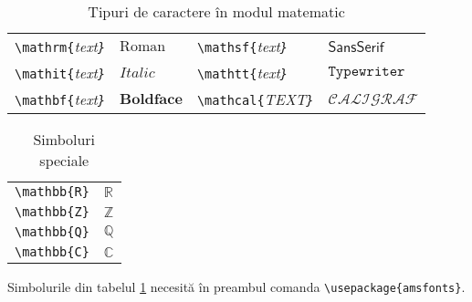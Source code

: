 \documentclass{article}
\begin{document}
\begin{table}
\begin{tabular}{llll}
\verb|\mathrm{|\em{text}\verb|}|  &$\mathrm{Roman}$&\verb|\mathsf{|\em{text}\verb|}|&$\mathsf{Sans Serif}$\\
\verb|\mathit{|\em{text}\verb|}|  &$\mathit{Italic}$&\verb|\mathtt{|\em{text}\verb|}|&$\mathtt{Typewriter}$\\
\verb|\mathbf{|\em{text}\verb|}|&$\mathbf{Boldface}$&\verb|\mathcal{|\em{TEXT}\verb|}|&$\mathcal{CALIGRAF}$\\
\end{tabular}
\caption{Tipuri de caractere în  modul matematic}
\end{table}

\begin{table}
\centering
\begin{tabular}{ll}
\verb+\mathbb{R}+&$\mathbb{R}$\\
\verb+\mathbb{Z}+&$\mathbb{Z}$\\
\verb+\mathbb{Q}+&$\mathbb{Q}$\\
\verb+\mathbb{C}+&$\mathbb{C}$
\end{tabular}
\caption{Simboluri speciale}\label{tab:amsfont}
\end{table}

Simbolurile din tabelul \ref{tab:amsfont} necesită în preambul comanda
\verb+\usepackage{amsfonts}+. 
\end{document}
